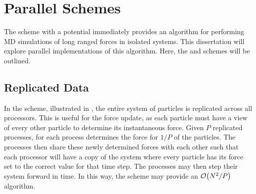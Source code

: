 \section{Parallel Schemes}

%
The \velocityverlet{} scheme with a \twobody{} potential
immediately provides an algorithm for
performing MD simulations of long ranged forces in isolated systems.
%
This dissertation will explore parallel implementations of this algorithm.
%
Here, the \replicateddata{} and \systolicloop{} schemes will be outlined.



\subsection{Replicated Data}
\label{sec:background:subsec:replicated_data}

%
In the \replicateddata{} scheme, illustrated in
,
the entire system of particles is replicated across all processors.
%
This is useful for the force update, as each particle must have a view of
every other particle to determine its instantaneous force.
%
Given $P$ replicated processes, for each process
determines the force for $1/P$ of the particles.
%
The processes then share these newly determined forces with each other
such that each processor will have a copy of the system where every
particle has its force set to the correct value for that time step.
%
The processes may then step their system forward in time.
%
In this way, the \replicateddata{} scheme may provide
an $\mathcal{O}{\left({ N^2/P }\right)}$ algorithm.


